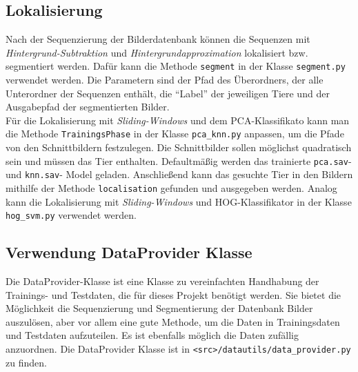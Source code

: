 \subsection*{Lokalisierung} \label{ssec:Tut:Loc}
Nach der Sequenzierung der Bilderdatenbank können die Sequenzen mit \textit{Hintergrund-Subtraktion} und \textit{Hintergrundapproximation} lokalisiert bzw. segmentiert werden. Dafür kann die Methode \texttt{segment} in der Klasse \texttt{segment.py} verwendet werden.
Die Parametern sind der Pfad des Überordners, der alle Unterordner der Sequenzen enthält, die \enquote{Label} der jeweiligen Tiere und der Ausgabepfad der segmentierten Bilder.\\

Für die Lokalisierung mit \textit{Sliding-Windows} und dem PCA-Klassifikato kann man die Methode \texttt{TrainingsPhase} in der Klasse \texttt{pca\_knn.py} anpassen, um die Pfade von den Schnittbildern festzulegen. Die Schnittbilder sollen möglichst quadratisch sein und müssen das Tier enthalten. Defaultmäßig werden das trainierte \texttt{pca.sav}- und \texttt{knn.sav}- Model geladen. Anschließend kann das gesuchte Tier in den Bildern mithilfe der Methode \texttt{localisation} gefunden und ausgegeben werden. Analog kann die Lokalisierung mit \textit{Sliding-Windows} und HOG-Klassifikator in der Klasse \texttt{hog\_svm.py} verwendet werden.

\subsection*{Verwendung DataProvider Klasse} \label{sec:Tut:DataProvider}
Die DataProvider-Klasse ist eine Klasse zu vereinfachten Handhabung der Trainings- und Testdaten, die für dieses Projekt benötigt werden. Sie bietet die Möglichkeit die Sequenzierung und Segmentierung der Datenbank Bilder auszulösen, aber vor allem eine gute Methode, um die Daten in Trainingsdaten und Testdaten aufzuteilen. Es ist ebenfalls möglich die Daten zufällig anzuordnen. Die DataProvider Klasse ist in \texttt{<src>/datautils/data\_provider.py} zu finden.

